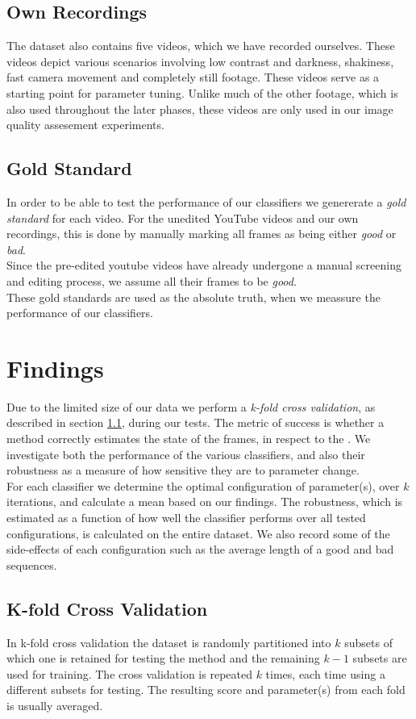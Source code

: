 \subsection{Own Recordings}
%
The dataset also contains five videos, which we have recorded ourselves. These videos depict various scenarios involving low contrast and darkness, shakiness, fast camera movement and completely still footage. These videos serve as a starting point for parameter tuning. Unlike much of the other footage, which is also used throughout the later phases, these videos are only used in our image quality assesement experiments.
%
%
\subsection{Gold Standard}\label{sec:goldstandard}
%
In order to be able to test the performance of our classifiers we genererate a \textit{gold standard} for each video. For the unedited YouTube videos and our own recordings, this is done by manually marking all frames as being either \textit{good} or \textit{bad}.\\
Since the pre-edited youtube videos have already undergone a manual screening and editing process, we assume all their frames to be \textit{good}.\\
These gold standards are used as the absolute truth, when we meassure the performance of our classifiers.
%
\section{Findings}
%
Due to the limited size of our data we perform a \emph{k-fold cross validation}, as described in section \ref{sec:kfoldxval}, during our tests. The metric of success is whether a method correctly estimates the state of the frames, in respect to the . We investigate both the performance of the various classifiers, and also their robustness as a measure of how sensitive they are to parameter change.\\
For each classifier we determine the optimal configuration of parameter(s), over $k$ iterations, and calculate a mean based on our findings. The robustness, which is estimated as a function of how well the classifier performs over all tested configurations, is calculated on the entire dataset. We also record some of the side-effects of each configuration such as the average length of a good and bad sequences.
%
\subsection{K-fold Cross Validation}\label{sec:kfoldxval}
%
 In k-fold cross validation the dataset is randomly partitioned into $k$ subsets of which one is retained for testing the method and the remaining $k-1$ subsets are used for training. The cross validation is repeated $k$ times, each time using a different subsets for testing. The resulting score and parameter(s) from each fold is usually averaged.
%
